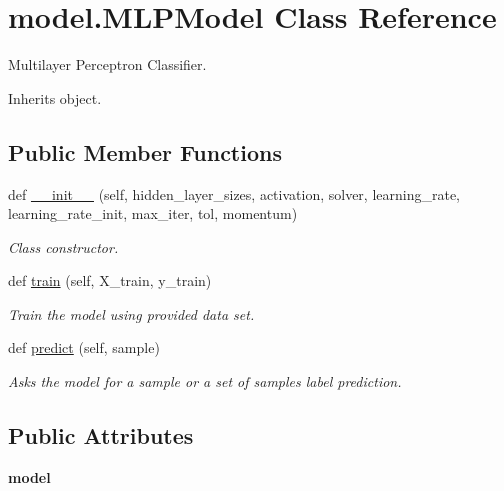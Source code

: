 \hypertarget{classmodel_1_1_m_l_p_model}{}\section{model.\+M\+L\+P\+Model Class Reference}
\label{classmodel_1_1_m_l_p_model}


Multilayer Perceptron Classifier.  




Inherits object.

\subsection*{Public Member Functions}
\begin{DoxyCompactItemize}
\item 
def \mbox{\hyperlink{classmodel_1_1_m_l_p_model_af9eb7cda208eabb7ec7c91b7064d3769}{\+\_\+\+\_\+init\+\_\+\+\_\+}} (self, hidden\+\_\+layer\+\_\+sizes, activation, solver, learning\+\_\+rate, learning\+\_\+rate\+\_\+init, max\+\_\+iter, tol, momentum)
\begin{DoxyCompactList}\small\item\em Class constructor. \end{DoxyCompactList}\item 
def \mbox{\hyperlink{classmodel_1_1_m_l_p_model_a08d6099f82c8e7590f725d8be8d5f7a0}{train}} (self, X\+\_\+train, y\+\_\+train)
\begin{DoxyCompactList}\small\item\em Train the model using provided data set. \end{DoxyCompactList}\item 
\mbox{\label{classmodel_1_1_m_l_p_model_aab400478633ca33e2b1507f7d8794579}} 
def \mbox{\hyperlink{classmodel_1_1_m_l_p_model_aab400478633ca33e2b1507f7d8794579}{predict}} (self, sample)
\begin{DoxyCompactList}\small\item\em Asks the model for a sample or a set of samples label prediction. \end{DoxyCompactList}\end{DoxyCompactItemize}
\subsection*{Public Attributes}
\begin{DoxyCompactItemize}
\item 
\mbox{\label{classmodel_1_1_m_l_p_model_a19e17c9cdc79b7d3d44a70a0624c94e4}} 
{\bfseries model}
\end{DoxyCompactItemize}


